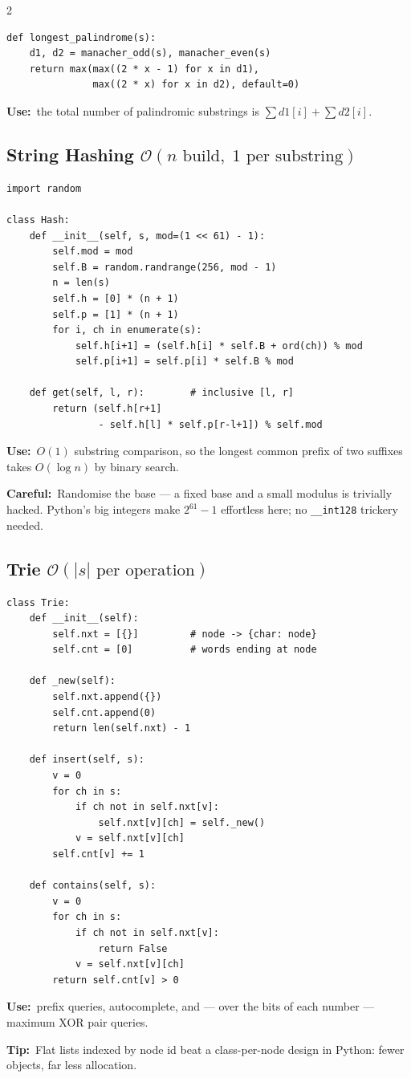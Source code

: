 \documentclass[10pt]{article}
\newcommand{\code}[1]{\texttt{\small #1}}
\newcommand{\sub}[2]{\subsection[#1]{#1\hspace{0.6em}%
  \textnormal{\color{accent2}\small$\mathcal{O}(#2)$}}}
\newcommand{\uses}[1]{{\color{accent2}\footnotesize\textbf{Use:}}~{\footnotesize #1}\par}
\newcommand{\tip}[1]{{\color{tipc}\footnotesize\textbf{Tip:}}~{\footnotesize #1}\par}
\newcommand{\warn}[1]{{\color{warnc}\footnotesize\textbf{Careful:}}~{\footnotesize #1}\par}
\begin{document}
\begin{multicols}{2}
\begin{lstlisting}
def longest_palindrome(s):
    d1, d2 = manacher_odd(s), manacher_even(s)
    return max(max((2 * x - 1) for x in d1),
               max((2 * x) for x in d2), default=0)
\end{lstlisting}
\uses{the total number of palindromic substrings is
$\sum d1[i] + \sum d2[i]$.}

\sub{String Hashing}{n \text{ build},\; 1 \text{ per substring}}
\begin{lstlisting}
import random

class Hash:
    def __init__(self, s, mod=(1 << 61) - 1):
        self.mod = mod
        self.B = random.randrange(256, mod - 1)
        n = len(s)
        self.h = [0] * (n + 1)
        self.p = [1] * (n + 1)
        for i, ch in enumerate(s):
            self.h[i+1] = (self.h[i] * self.B + ord(ch)) % mod
            self.p[i+1] = self.p[i] * self.B % mod

    def get(self, l, r):        # inclusive [l, r]
        return (self.h[r+1]
                - self.h[l] * self.p[r-l+1]) % self.mod
\end{lstlisting}
\uses{$O(1)$ substring comparison, so the longest common prefix of two
suffixes takes $O(\log n)$ by binary search.}
\warn{Randomise the base --- a fixed base and a small modulus is
trivially hacked. Python's big integers make $2^{61}-1$ effortless here;
no \code{\_\_int128} trickery needed.}

\sub{Trie}{|s| \text{ per operation}}
\begin{lstlisting}
class Trie:
    def __init__(self):
        self.nxt = [{}]         # node -> {char: node}
        self.cnt = [0]          # words ending at node

    def _new(self):
        self.nxt.append({})
        self.cnt.append(0)
        return len(self.nxt) - 1

    def insert(self, s):
        v = 0
        for ch in s:
            if ch not in self.nxt[v]:
                self.nxt[v][ch] = self._new()
            v = self.nxt[v][ch]
        self.cnt[v] += 1

    def contains(self, s):
        v = 0
        for ch in s:
            if ch not in self.nxt[v]:
                return False
            v = self.nxt[v][ch]
        return self.cnt[v] > 0
\end{lstlisting}
\uses{prefix queries, autocomplete, and --- over the bits of each number
--- maximum XOR pair queries.}
\tip{Flat lists indexed by node id beat a class-per-node design in
Python: fewer objects, far less allocation.}

\end{multicols}
\end{document}
